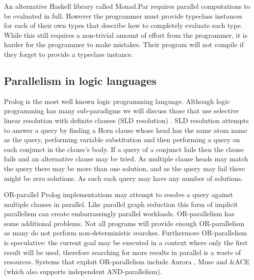 An alternative Haskell library called Monad.Par \citep{marlow:monadpar}
requires parallel computations to be evaluated in full.
However the programmer must provide typeclass instances for each of their
own types that describe how to completely evaluate each type.
While this still requires a non-trivial amount of effort from the
programmer,
it is harder for the programmer to make mistakes.
Their program will not compile if they forget to provide a typeclass
instance.

\subsection{Parallelism in logic languages}
\label{sec:intro_par_logic}

Prolog is the most well known logic programming language.
Although logic programming has many sub-paradigms we will discuss
those that use selective linear resolution with definite clauses
(SLD resolution) \citep{kowalski_sld}.
SLD resolution attempts to answer a query by finding a Horn clause whose
head has the same atom name as the query,
performing variable substitution and then performing a query on each
conjunct in the clause's body.
If a query of a conjunct fails then the clause fails and an alternative
clause may be tried.
As multiple clause heads may match the query there may be more than one
solution,
and as the query may fail there might be zero solutions.
As such each query may have any number of solutions.

OR-parallel Prolog implementations may attempt to resolve a query against
multiple clauses in parallel.
Like parallel graph reduction this form of implicit parallelism can create
embarrassingly parallel workloads.
OR-parallelism has some additional problems.
Not all programs will provide enough OR-parallelism as many do not perform
non-deterministic searches.
Furthermore OR-parallelism is speculative:
the current goal may be executed in a context where only the first result
will be used,
therefore searching for more results in parallel is a waste of resources.
Systems that exploit OR-parallelism include
Aurora \citep{lusk:1990:aurora},
Muse \citep{ali:1990:muse}
and \&ACE \citep{gupta:1991:ace} (which also supports independent AND-parallelism).

